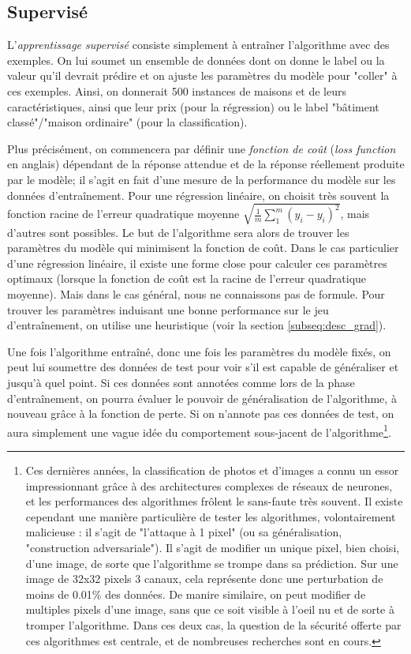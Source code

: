 \subsection{Supervisé}
L'\emph{apprentissage supervisé} consiste simplement à entraîner l'algorithme avec des exemples. On lui soumet un ensemble de données dont on donne le label ou la valeur qu'il devrait prédire et on ajuste les paramètres du modèle pour "coller" à ces exemples. Ainsi, on donnerait 500 instances de maisons et de leurs caractéristiques, ainsi que leur prix (pour la régression) ou le label "bâtiment classé"/"maison ordinaire" (pour la classification).

Plus précisément, on commencera par définir une \emph{fonction de coût} (\emph{loss function} en anglais) dépendant de la réponse attendue et de la réponse réellement produite par le modèle; il s'agit en fait d'une mesure de la performance du modèle sur les données d'entraînement. Pour une régression linéaire, on choisit très souvent la fonction racine de l'erreur quadratique moyenne \(\sqrt{\frac{1}{m}\sum_1^m(\hat y_i - y_i)^2}\), mais d'autres sont possibles. Le but de l'algorithme sera alors de trouver les paramètres du modèle qui minimisent la fonction de coût. Dans le cas particulier d'une régression linéaire, il existe une forme close pour calculer ces paramètres optimaux (lorsque la fonction de coût est la racine de l'erreur quadratique moyenne). Mais dans le cas général, nous ne connaissons pas de formule. Pour trouver les paramètres induisant une bonne performance sur le jeu d'entraînement, on utilise une heuristique (voir la section \ref{subseq:desc_grad}).

Une fois l'algorithme entraîné, donc une fois les paramètres du modèle fixés, on peut lui soumettre des données de test pour voir s'il est capable de généraliser et jusqu'à quel point. Si ces données sont annotées comme lors de la phase d'entraînement, on pourra évaluer le pouvoir de généralisation de l'algorithme, à nouveau grâce à la fonction de perte. Si on n'annote pas ces données de test, on aura simplement une vague idée du comportement sous-jacent de l'algorithme\footnote{Ces dernières années, la classification de photos et d'images a connu un essor impressionnant grâce à des architectures complexes de réseaux de neurones, et les performances des algorithmes frôlent le sans-faute très souvent. Il existe cependant une manière particulière de tester les algorithmes, volontairement malicieuse : il s'agit de "l'attaque à 1 pixel" (ou sa généralisation, "construction adversariale"). Il s'agit de modifier un unique pixel, bien choisi, d'une image, de sorte que l'algorithme se trompe dans sa prédiction. Sur une image de 32x32 pixels 3 canaux, cela représente donc une perturbation de moins de 0.01\% des données. De manire similaire, on peut modifier de multiples pixels d'une image, sans que ce soit visible à l'oeil nu et de sorte à tromper l'algorithme. Dans ces deux cas, la question de la sécurité offerte par ces algorithmes est centrale, et de nombreuses recherches sont en cours.}.


